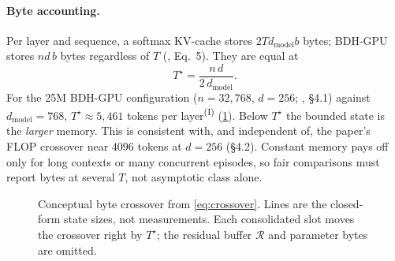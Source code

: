 \documentclass[10pt]{article}
\theoremstyle{remark}
\newcommand{\IN}{\textsuperscript{(I)}}
\newcommand{\cdlr}{\textsc{CDLR}}
\begin{document}
\paragraph{Byte accounting.} Per layer and sequence, a softmax KV-cache stores $2Td_{\text{model}}b$ bytes; BDH-GPU
stores $nd\,b$ bytes regardless of $T$ (\citealp{kosowski2025bdh}, Eq.~5). They are equal at
\begin{equation}
T^\star=\frac{n\,d}{2\,d_{\text{model}}}.
\label{eq:crossover}
\end{equation}
For the 25M BDH-GPU configuration ($n=32{,}768$, $d=256$; \citealp{kosowski2025bdh}, \S4.1) against
$d_{\text{model}}=768$, $T^\star\approx5{,}461$ tokens per layer\IN{} (\cref{fig:crossover}). Below $T^\star$ the bounded
state is the \emph{larger} memory. This is consistent with, and independent of, the paper's FLOP crossover near
4096 tokens at $d=256$ (\S4.2). Constant memory pays off only for long contexts or many concurrent episodes, so fair
comparisons must report bytes at several $T$, not asymptotic class alone.

\begin{figure}[t]
\centering
{}
\caption{Conceptual byte crossover from \cref{eq:crossover}. Lines are the closed-form state sizes, not
measurements. Each consolidated slot moves the crossover right by $T^\star$; the residual buffer $\mathcal{R}$ and
parameter bytes are omitted.}
\label{fig:crossover}
\end{figure}
\end{document}
